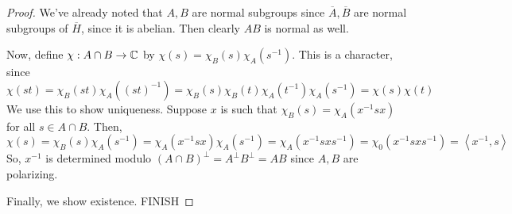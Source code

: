\begin{proof}
	We've already noted that $A,B$ are normal subgroups since $\overline{A},\overline{B}$ are normal subgroups of $\overline{H}$, since it is abelian. Then clearly $AB$ is normal as well.
	
	Now, define $\chi : A \cap B \to \mathbb{C}$ by $\chi(s) = \chi_B(s)\chi_A(s^{-1})$. This is a character, since
	\[ \chi(st) = \chi_B(st)\chi_A((st)^{-1}) = \chi_B(s)\chi_B(t)\chi_A(t^{-1})\chi_A(s^{-1}) = \chi(s)\chi(t) \]
	We use this to show uniqueness. Suppose $x$ is such that $\chi_B(s) = \chi_A(x^{-1}sx)$ for all $s \in A \cap B$. Then,
	\[ \chi(s) = \chi_B(s)\chi_A(s^{-1}) = \chi_A(x^{-1}sx)\chi_A(s^{-1}) = \chi_A(x^{-1}sxs^{-1}) = \chi_0(x^{-1}sxs^{-1}) = \left<x^{-1},s\right> \]
	So, $x^{-1}$ is determined modulo $(A \cap B)^\perp = A^\perp B^\perp = AB$ since $A,B$ are polarizing.
	
	Finally, we show existence. FINISH
	
	
	
	
\end{proof}
